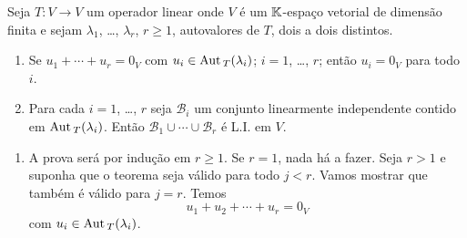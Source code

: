 \begin{teorema}
	Seja $T : V \to V$ um operador linear onde $V$ \'e um $\mathbb{K}$-espa\c{c}o vetorial de dimens\~ao finita e sejam $\lambda_1$, \dots, $\lambda_r$, $r \ge 1$, autovalores de $T$, dois a dois distintos.
	\begin{enumerate}[label={\roman*})]
		\item Se $u_1 + \cdots + u_r = 0_V$ com $u_i \in {\rm Aut\,}_T(\lambda_i)$; $i = 1$, \dots, $r$; ent\~ao $u_i = 0_V$ para todo $i$.
		\item Para cada $i = 1$, \dots, $r$ seja $\mathcal{B}_i$ um conjunto linearmente independente contido em ${\rm Aut\,}_T(\lambda_i)$. Ent\~ao $\mathcal{B}_1 \cup \cdots \cup \mathcal{B}_r$ \'e L.I. em $V$.
	\end{enumerate}
\end{teorema}
\begin{prova}
	\begin{enumerate}[label={\roman*})]
		\item A prova ser\'a por indu\c{c}\~ao em $r \ge 1$. Se $r = 1$, nada h\'a a fazer. Seja $r > 1$ e suponha que o teorema seja v\'alido para todo $j < r$. Vamos mostrar que tamb\'em \'e v\'alido para $j = r$. Temos
		\begin{equation}\label{equacaoauxiliar1}
			u_1 + u_2 + \cdots + u_r = 0_V
		\end{equation}
		com $u_i \in {\rm Aut\,}_T(\lambda_i)$.


\end{enumerate}
\end{prova}
